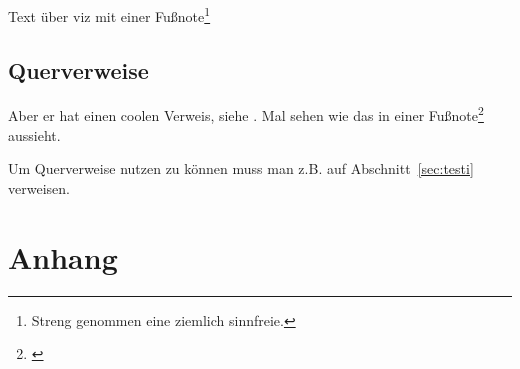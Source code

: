 \documentclass[a4paper, 12pt, onepage, pdftex, headsepline, footsepline]{scrreprt}
\begin{document}
Text über viz mit einer Fußnote\footnote{Streng genommen eine ziemlich sinnfreie.}

\section*{Querverweise}

Aber er hat einen coolen Verweis, siehe \cite[S.\,35--38]{Visualisierung}.
Mal sehen wie das in einer Fußnote\footnote{\cite{Visualisierung}} aussieht.

Um Querverweise nutzen zu können muss man z.B. auf Abschnitt~\ref{sec:testi} verweisen.



\listoftables
\listoffigures
\chapter{Anhang}
\end{document}

